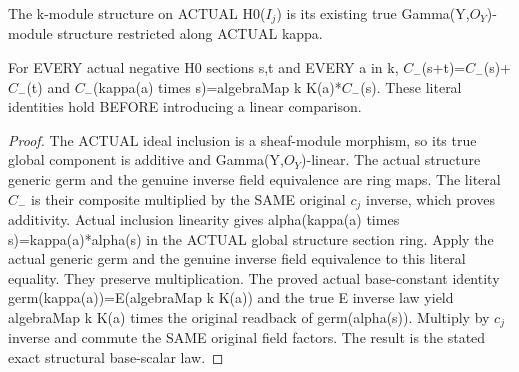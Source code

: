 \begin{definition}
\label{def:seven-native-negative-actual-base-action}
\leanok
The k-module structure on ACTUAL H0($I_j$) is its existing true
Gamma(Y,$O_Y$)-module structure restricted along ACTUAL kappa.
\end{definition}

\begin{theorem}
\label{thm:seven-native-negative-actual-scalar-laws}
\leanok
For EVERY actual negative H0 sections s,t and EVERY a in k,
$C_-$(s+t)=$C_-$(s)+$C_-$(t) and
$C_-$(kappa(a) times s)=algebraMap k K(a)*$C_-$(s).
These literal identities hold BEFORE introducing a linear comparison.
\end{theorem}
\begin{proof}
The ACTUAL ideal inclusion is a sheaf-module morphism, so its true
global component is additive and Gamma(Y,$O_Y$)-linear. The actual
structure generic germ and the genuine inverse field equivalence are
ring maps. The literal $C_-$ is their composite multiplied by the SAME
original $c_j$ inverse, which proves additivity. Actual inclusion
linearity gives alpha(kappa(a) times s)=kappa(a)*alpha(s) in the ACTUAL
global structure section ring. Apply the actual generic germ and the
genuine inverse field equivalence to this literal equality. They
preserve multiplication. The proved actual base-constant identity
germ(kappa(a))=E(algebraMap k K(a)) and the true E inverse law yield
algebraMap k K(a) times the original readback of germ(alpha(s)).
Multiply by $c_j$ inverse and commute the SAME original field factors.
The result is the stated exact structural base-scalar law.
\end{proof}

